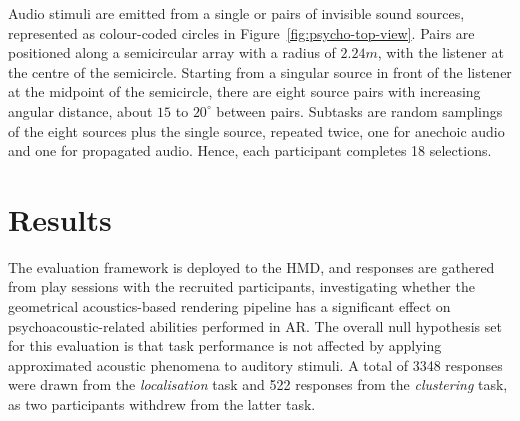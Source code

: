 Audio stimuli are emitted from a single or pairs of invisible sound sources, represented as colour-coded circles in Figure~\ref{fig:psycho-top-view}. Pairs are positioned along a semicircular array with a radius of $2.24m$, with the listener at the centre of the semicircle. Starting from a singular source in front of the listener at the midpoint of the semicircle, there are eight source pairs with increasing angular distance, about $15$ to $20^\circ$ between pairs. Subtasks are random samplings of the eight sources plus the single source, repeated twice, one for anechoic audio and one for propagated audio. Hence, each participant completes 18 selections. \par

\section{Results}
The evaluation framework is deployed to the HMD, and responses are gathered from play sessions with the recruited participants, investigating whether the geometrical acoustics-based rendering pipeline has a significant effect on psychoacoustic-related abilities performed in AR. The overall null hypothesis set for this evaluation is that task performance is not affected by applying approximated acoustic phenomena to auditory stimuli. A total of 3348 responses were drawn from the \emph{localisation} task and 522 responses from the \emph{clustering} task, as two participants withdrew from the latter task. \par

